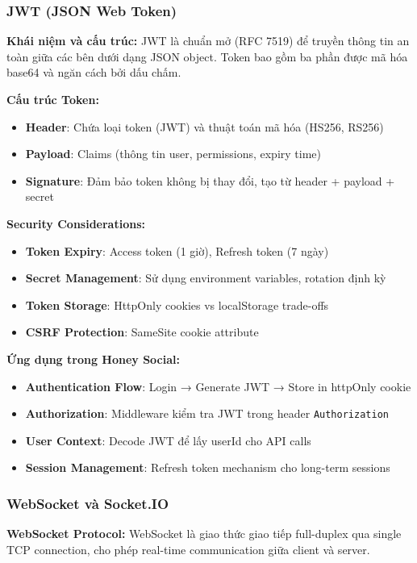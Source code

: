 \subsubsection{JWT (JSON Web Token)}
\textbf{Khái niệm và cấu trúc:}
JWT là chuẩn mở (RFC 7519) để truyền thông tin an toàn giữa các bên dưới dạng JSON object. Token bao gồm ba phần được mã hóa base64 và ngăn cách bởi dấu chấm.

\textbf{Cấu trúc Token:}
\begin{itemize}
\item \textbf{Header}: Chứa loại token (JWT) và thuật toán mã hóa (HS256, RS256)
\item \textbf{Payload}: Claims (thông tin user, permissions, expiry time)
\item \textbf{Signature}: Đảm bảo token không bị thay đổi, tạo từ header + payload + secret
\end{itemize}

\textbf{Security Considerations:}
\begin{itemize}
\item \textbf{Token Expiry}: Access token (1 giờ), Refresh token (7 ngày)
\item \textbf{Secret Management}: Sử dụng environment variables, rotation định kỳ
\item \textbf{Token Storage}: HttpOnly cookies vs localStorage trade-offs
\item \textbf{CSRF Protection}: SameSite cookie attribute
\end{itemize}

\textbf{Ứng dụng trong Honey Social:}
\begin{itemize}
\item \textbf{Authentication Flow}: Login → Generate JWT → Store in httpOnly cookie
\item \textbf{Authorization}: Middleware kiểm tra JWT trong header \texttt{Authorization}
\item \textbf{User Context}: Decode JWT để lấy userId cho API calls
\item \textbf{Session Management}: Refresh token mechanism cho long-term sessions
\end{itemize}

\subsubsection{WebSocket và Socket.IO}
\textbf{WebSocket Protocol:}
WebSocket là giao thức giao tiếp full-duplex qua single TCP connection, cho phép real-time communication giữa client và server.

